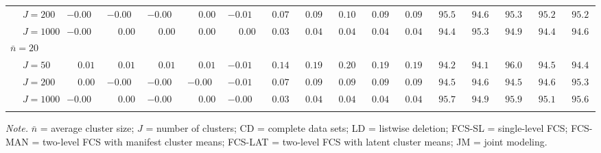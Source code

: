 \begin{sidewaystable}
\begin{threeparttable}
\begin{tabular}{llccccccccccccccc}
 & \nopagebreak $\;J=200$  & ${-}0.00\phantom{0}$ & ${-}0.00\phantom{0}$ & ${-}0.00\phantom{0}$ & $\phantom{-}0.00\phantom{0}$ & ${-}0.01\phantom{0}$ & $\phantom{0}0.07\phantom{0}$ & $\phantom{0}0.09\phantom{0}$ & $\phantom{0}0.10\phantom{0}$ & $\phantom{0}0.09\phantom{0}$ & $\phantom{0}0.09\phantom{0}$ & $\phantom{0}95.5\phantom{0}$ & $\phantom{0}94.6\phantom{0}$ & $\phantom{0}95.3\phantom{0}$ & $\phantom{0}95.2\phantom{0}$ & $\phantom{0}95.2\phantom{0}$ \\
 & \nopagebreak $\;J=1000$  & ${-}0.00\phantom{0}$ & $\phantom{-}0.00\phantom{0}$ & $\phantom{-}0.00\phantom{0}$ & $\phantom{-}0.00\phantom{0}$ & $\phantom{-}0.00\phantom{0}$ & $\phantom{0}0.03\phantom{0}$ & $\phantom{0}0.04\phantom{0}$ & $\phantom{0}0.04\phantom{0}$ & $\phantom{0}0.04\phantom{0}$ & $\phantom{0}0.04\phantom{0}$ & $\phantom{0}94.4\phantom{0}$ & $\phantom{0}95.3\phantom{0}$ & $\phantom{0}94.9\phantom{0}$ & $\phantom{0}94.4\phantom{0}$ & $\phantom{0}94.6\phantom{0}$ \\
\multicolumn{4}{l}{$\bar{n}=20$} \\  & \nopagebreak $\;J=50$  & $\phantom{-}0.01\phantom{0}$ & $\phantom{-}0.01\phantom{0}$ & $\phantom{-}0.01\phantom{0}$ & $\phantom{-}0.01\phantom{0}$ & ${-}0.01\phantom{0}$ & $\phantom{0}0.14\phantom{0}$ & $\phantom{0}0.19\phantom{0}$ & $\phantom{0}0.20\phantom{0}$ & $\phantom{0}0.19\phantom{0}$ & $\phantom{0}0.19\phantom{0}$ & $\phantom{0}94.2\phantom{0}$ & $\phantom{0}94.1\phantom{0}$ & $\phantom{0}96.0\phantom{0}$ & $\phantom{0}94.5\phantom{0}$ & $\phantom{0}94.4\phantom{0}$ \\
 & \nopagebreak $\;J=200$  & $\phantom{-}0.00\phantom{0}$ & ${-}0.00\phantom{0}$ & ${-}0.00\phantom{0}$ & ${-}0.00\phantom{0}$ & ${-}0.01\phantom{0}$ & $\phantom{0}0.07\phantom{0}$ & $\phantom{0}0.09\phantom{0}$ & $\phantom{0}0.09\phantom{0}$ & $\phantom{0}0.09\phantom{0}$ & $\phantom{0}0.09\phantom{0}$ & $\phantom{0}94.5\phantom{0}$ & $\phantom{0}94.6\phantom{0}$ & $\phantom{0}94.5\phantom{0}$ & $\phantom{0}94.6\phantom{0}$ & $\phantom{0}95.3\phantom{0}$ \\
 & \nopagebreak $\;J=1000$  & ${-}0.00\phantom{0}$ & $\phantom{-}0.00\phantom{0}$ & ${-}0.00\phantom{0}$ & $\phantom{-}0.00\phantom{0}$ & ${-}0.00\phantom{0}$ & $\phantom{0}0.03\phantom{0}$ & $\phantom{0}0.04\phantom{0}$ & $\phantom{0}0.04\phantom{0}$ & $\phantom{0}0.04\phantom{0}$ & $\phantom{0}0.04\phantom{0}$ & $\phantom{0}95.7\phantom{0}$ & $\phantom{0}94.9\phantom{0}$ & $\phantom{0}95.9\phantom{0}$ & $\phantom{0}95.1\phantom{0}$ & $\phantom{0}95.6\phantom{0}$ \\
[0.5ex]\hline\\[-1.6ex] 
\end{tabular}
\begin{tablenotes}{\footnotesize \textit{Note.} $\bar{n}$ = average cluster size; $J$ = number of clusters; CD = complete data sets; LD = listwise deletion; FCS-SL = single-level FCS; FCS-MAN = two-level FCS with manifest cluster means; FCS-LAT = two-level FCS with latent cluster means; JM = joint modeling.}\end{tablenotes}
\end{threeparttable}
\end{sidewaystable}
